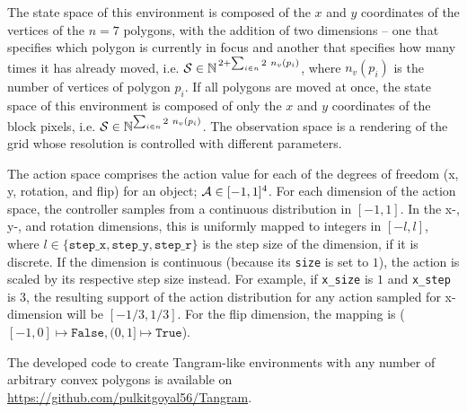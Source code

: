 The state space of this environment is composed of the \(x\) and \(y\) coordinates of the vertices of the \(n = 7\) polygons, with the addition of two dimensions -- one that specifies which polygon is currently in focus and another that specifies how many times it has already moved, i.e. \(\mathcal{S} \in \mathbb{N}^{\,2 + \sum_{i \in n} 2\ n_v(p_i)}\), where \(n_v(p_i)\) is the number of vertices of polygon \(p_i\).
If all polygons are moved at once, the state space of this environment is composed of only the \(x\) and \(y\) coordinates of the block pixels, i.e. \(\mathcal{S} \in \mathbb{N}^{\sum_{i \in n} 2\ n_v(p_i)}\).
The observation space is a rendering of the grid whose resolution is controlled with different parameters.

The action space comprises the action value for each of the degrees of freedom (x, y, rotation, and flip) for an object; \(\mathcal{A} \in [-1, 1]^4\).
For each dimension of the action space, the controller samples from a continuous distribution in \([-1, 1]\).
In the x-, y-, and rotation dimensions, this is uniformly mapped to integers in \([-l, l]\), where \(l \in \{\texttt{step\_x}, \texttt{step\_y}, \texttt{step\_r}\}\) is the step size of the dimension, if it is discrete.
If the dimension is continuous (because its \texttt{size} is set to \(1\)), the action is scaled by its respective step size instead.
For example, if \texttt{x\_size} is \(1\) and \texttt{x\_step} is \(3\), the resulting support of the action distribution for any action sampled for x-dimension will be \([-1/3, 1/3]\).
For the flip dimension, the mapping is (\([-1, 0] \mapsto \texttt{False}, (0, 1] \mapsto \texttt{True}\)).


The developed code to create Tangram-like environments with any number of arbitrary convex polygons is available on \url{https://github.com/pulkitgoyal56/Tangram}.


